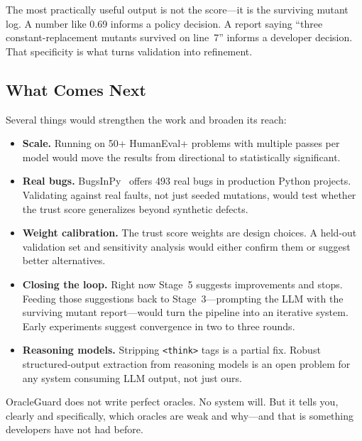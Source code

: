 \documentclass[conference]{IEEEtran}
\begin{document}
The most practically useful output is not the score---it is the surviving mutant log. A number like 0.69 informs a policy decision. A report saying ``three constant-replacement mutants survived on line~7'' informs a developer decision. That specificity is what turns validation into refinement.

\subsection{What Comes Next}

Several things would strengthen the work and broaden its reach:

\begin{itemize}
\item \textbf{Scale.} Running on 50+ HumanEval+ problems with multiple passes per model would move the results from directional to statistically significant.
\item \textbf{Real bugs.} BugsInPy~\cite{widyasari2020bugsinpy} offers 493 real bugs in production Python projects. Validating against real faults, not just seeded mutations, would test whether the trust score generalizes beyond synthetic defects.
\item \textbf{Weight calibration.} The trust score weights are design choices. A held-out validation set and sensitivity analysis would either confirm them or suggest better alternatives.
\item \textbf{Closing the loop.} Right now Stage~5 suggests improvements and stops. Feeding those suggestions back to Stage~3---prompting the LLM with the surviving mutant report---would turn the pipeline into an iterative system. Early experiments suggest convergence in two to three rounds.
\item \textbf{Reasoning models.} Stripping \texttt{<think>} tags is a partial fix. Robust structured-output extraction from reasoning models is an open problem for any system consuming LLM output, not just ours.
\end{itemize}

OracleGuard does not write perfect oracles. No system will. But it tells you, clearly and specifically, which oracles are weak and why---and that is something developers have not had before.




\appendix
\end{document}
